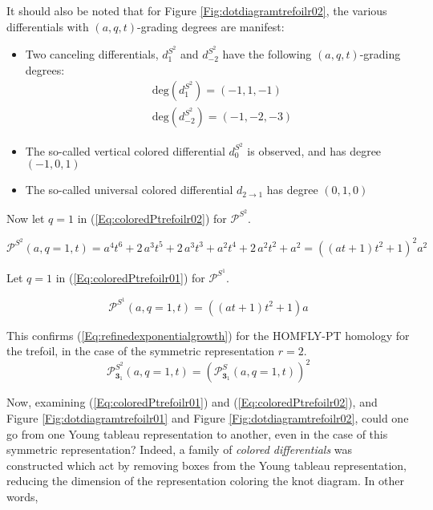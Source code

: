 \documentclass[a4paper,titlepage,twoside]{book}
\begin{document}
It should also be noted that for Figure \ref{Fig:dotdiagramtrefoilr02}, the various differentials with $(a,q,t)$-grading degrees are manifest:

\begin{itemize}
\item Two canceling differentials, $d_1^{S^2}$ and $d_{-2}^{S^2}$ have the following $(a,q,t)$-grading degrees:
\[
\begin{aligned}
  & \text{deg}{ (d_1^{S^2}) } = (-1,1,-1) \\
  &  \text{deg}{ (d_{-2}^{S^2} ) } = (-1,-2,-3)
\end{aligned}
\]
\item The so-called vertical colored differential $d_0^{S^2}$ is observed, and has degree $(-1,0,1)$
\item The so-called universal colored differential $d_{2\to 1}$ has degree $(0,1,0)$
\end{itemize}



Now let $q=1$ in (\ref{Eq:coloredPtrefoilr02}) for $\mathcal{P}^{S^2}$.  

\begin{equation}
  \mathcal{P}^{S^2}{ (a,q=1,t) } = a^{4} t^{6} + 2 \, a^{3} t^{5} + 2 \, a^{3} t^{3} + a^{2} t^{4} + 2 \, a^{2} t^{2} + a^{2} = {\left( ( a t +  1) t^{2} + 1\right)}^{2} a^{2}
\end{equation}

Let $q=1$ in (\ref{Eq:coloredPtrefoilr01}) for $\mathcal{P}^{S^1}$.  

\begin{equation}
  \mathcal{P}^{S^1}{ (a,q=1,t) } = {\left( ( a t +  1 ) t^{2} + 1\right)} a
\end{equation}


This confirms (\ref{Eq:refinedexponentialgrowth}) for the HOMFLY-PT homology for the trefoil, in the case of the symmetric representation $r=2$.  %
\[
\mathcal{P}^{S^2}_{\mathbf{3}_1}{ (a,q=1,t) } = ( \mathcal{P}^S_{\mathbf{3}_1}{ (a,q=1,t)} )^2
\]


Now, examining (\ref{Eq:coloredPtrefoilr01}) and (\ref{Eq:coloredPtrefoilr02}), and Figure \ref{Fig:dotdiagramtrefoilr01} and Figure \ref{Fig:dotdiagramtrefoilr02}, could one go from one Young tableau representation to another, even in the case of this symmetric representation?  Indeed, a family of \emph{colored differentials} was constructed \cite{GukovStosic2012} which act by removing boxes from the Young tableau representation, reducing the dimension of the representation coloring the knot diagram.  In other words,
\end{document}
